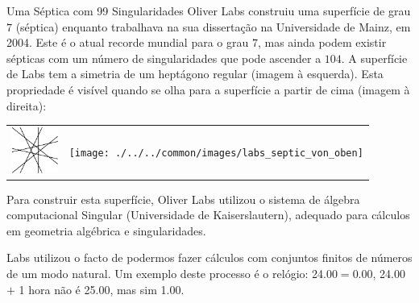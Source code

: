 \begin{surferPage}{Uma S\'eptica com 99 Singularidades}
    Oliver Labs construiu uma superf\'icie de grau $7$ (s\'eptica) enquanto trabalhava na sua disserta\c c\~ao na Universidade de Mainz, em 2004. Este \'e o atual recorde mundial para o grau $7$, mas ainda podem existir s\'epticas com um n\'umero de singularidades que pode ascender a $104$.  
    A superf\'icie de Labs tem a simetria de um hept\'agono regular (imagem \`a esquerda).
   Esta propriedade \'e vis\'ivel quando se olha para a superf\'icie a partir de cima (imagem \`a direita):

    \vspace*{-0.3em}
    \begin{center}
      \begin{tabular}{c@{\qquad}c}
        \includegraphics[height=1.5cm]{./../../common/images/labsseptic1.pdf}
        &
        \texttt{[image: ./../../common/images/labs\_septic\_von\_oben]}
      \end{tabular}
    \end{center}
    \vspace*{-0.3em}

    Para construir esta superf\'icie, Oliver Labs utilizou o sistema de \'algebra computacional {\sc Singular} (Universidade de Kaiserslautern),  adequado para c\'alculos em geometria alg\'ebrica e singularidades.

    Labs utilizou o facto de podermos fazer c\'alculos com conjuntos finitos de n\'umeros de um modo natural. Um exemplo deste processo \'e o rel\'ogio: 24.00$=$0.00, 24.00 $+$ 1 hora n\~ao \'e
    25.00, mas sim 1.00.
\end{surferPage}
